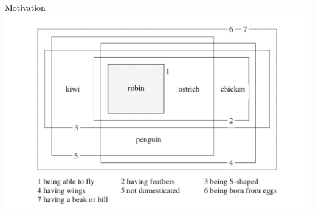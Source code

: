 \documentclass[10pt, xcolor=dvipsnames]{beamer}
\begin{document}
  

\begin{frame}[fragile]{Motivation}
  \includegraphics[scale=.33]{img/familyres.png}
\end{frame}


%
%
\end{document}
